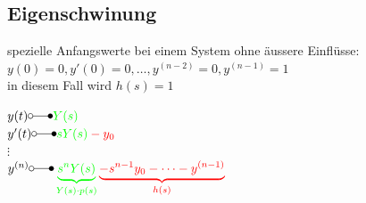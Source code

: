 	\subsection{Eigenschwinung}
		\begin{minipage}{12cm}
			spezielle Anfangswerte bei einem System ohne äussere Einflüsse:\\
			$y(0) = 0, y'(0) = 0, \dots , y^{(n-2)} = 0, y^{(n-1)} = 1$\\
			in diesem Fall wird $h(s) = 1$\\
		\end{minipage}
		\begin{minipage}{6cm}
			$y(t) \laplace \color{green} Y(s)$\\
			$y'(t) \laplace \color{green} sY(s)\color{red} - y_0$\\
			$\vdots$\\
			$y^{(n)} \laplace 
			\color{green}\underbrace{s^nY(s)}_{Y(s) \cdot p(s)}
			\color{red}\underbrace{-s^{n-1}y_0 - \dots - y^{(n-1)}}_{h(s)}$
		\end{minipage}